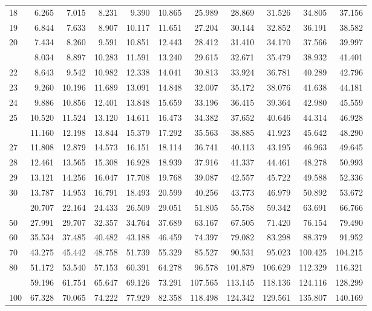 \documentclass[]{article}
\begin{document}
\begin{table}[H]
\begin{tabular}{lrrrrrrrrrr}
18 & 6.265 & 7.015 & 8.231 & 9.390 & 10.865 & 25.989 & 28.869 & 31.526 & 34.805 & 37.156\\
19 & 6.844 & 7.633 & 8.907 & 10.117 & 11.651 & 27.204 & 30.144 & 32.852 & 36.191 & 38.582\\
20 & 7.434 & 8.260 & 9.591 & 10.851 & 12.443 & 28.412 & 31.410 & 34.170 & 37.566 & 39.997\\
\addlinespace
21 & 8.034 & 8.897 & 10.283 & 11.591 & 13.240 & 29.615 & 32.671 & 35.479 & 38.932 & 41.401\\
22 & 8.643 & 9.542 & 10.982 & 12.338 & 14.041 & 30.813 & 33.924 & 36.781 & 40.289 & 42.796\\
23 & 9.260 & 10.196 & 11.689 & 13.091 & 14.848 & 32.007 & 35.172 & 38.076 & 41.638 & 44.181\\
24 & 9.886 & 10.856 & 12.401 & 13.848 & 15.659 & 33.196 & 36.415 & 39.364 & 42.980 & 45.559\\
25 & 10.520 & 11.524 & 13.120 & 14.611 & 16.473 & 34.382 & 37.652 & 40.646 & 44.314 & 46.928\\
\addlinespace
26 & 11.160 & 12.198 & 13.844 & 15.379 & 17.292 & 35.563 & 38.885 & 41.923 & 45.642 & 48.290\\
27 & 11.808 & 12.879 & 14.573 & 16.151 & 18.114 & 36.741 & 40.113 & 43.195 & 46.963 & 49.645\\
28 & 12.461 & 13.565 & 15.308 & 16.928 & 18.939 & 37.916 & 41.337 & 44.461 & 48.278 & 50.993\\
29 & 13.121 & 14.256 & 16.047 & 17.708 & 19.768 & 39.087 & 42.557 & 45.722 & 49.588 & 52.336\\
30 & 13.787 & 14.953 & 16.791 & 18.493 & 20.599 & 40.256 & 43.773 & 46.979 & 50.892 & 53.672\\
\addlinespace
40 & 20.707 & 22.164 & 24.433 & 26.509 & 29.051 & 51.805 & 55.758 & 59.342 & 63.691 & 66.766\\
50 & 27.991 & 29.707 & 32.357 & 34.764 & 37.689 & 63.167 & 67.505 & 71.420 & 76.154 & 79.490\\
60 & 35.534 & 37.485 & 40.482 & 43.188 & 46.459 & 74.397 & 79.082 & 83.298 & 88.379 & 91.952\\
70 & 43.275 & 45.442 & 48.758 & 51.739 & 55.329 & 85.527 & 90.531 & 95.023 & 100.425 & 104.215\\
80 & 51.172 & 53.540 & 57.153 & 60.391 & 64.278 & 96.578 & 101.879 & 106.629 & 112.329 & 116.321\\
\addlinespace
90 & 59.196 & 61.754 & 65.647 & 69.126 & 73.291 & 107.565 & 113.145 & 118.136 & 124.116 & 128.299\\
100 & 67.328 & 70.065 & 74.222 & 77.929 & 82.358 & 118.498 & 124.342 & 129.561 & 135.807 & 140.169\\
\bottomrule
\end{tabular}
\end{table}
\end{document}
